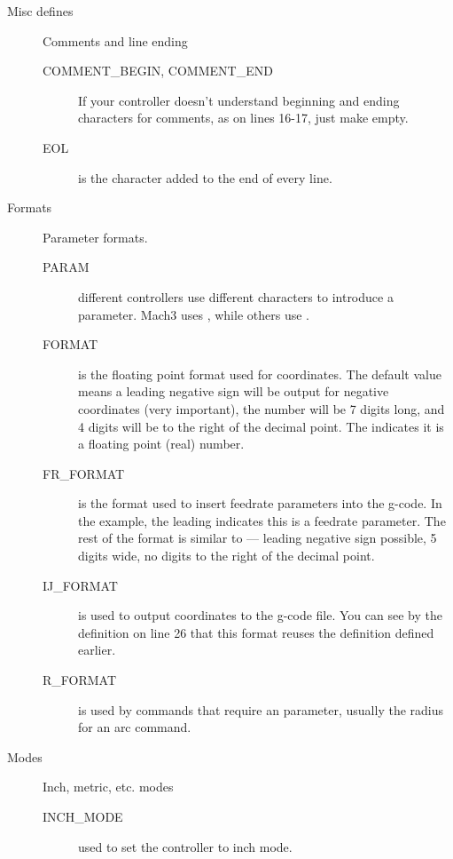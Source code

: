\documentclass[11pt]{book}
\begin{document}
\begin{description}
\item[Misc defines] Comments and line ending
\begin{description}
	\item[COMMENT\_{}BEGIN, COMMENT\_{}END] If your controller doesn't understand beginning and ending characters for comments, as on lines 16-17, just make  empty.

	\item[EOL] is the character added to the end of every line.
\end{description}

\item[Formats] Parameter formats.
\begin{description}
    \item[PARAM] different controllers use different characters to introduce a parameter. Mach3 uses , while others use \code{\#}.
    
    \item[FORMAT] is the floating point format used for coordinates. The default value  means a leading negative sign will be output for negative coordinates (very important), the number will be 7 digits long, and 4 digits will be to the right of the decimal point. The  indicates it is a floating point (real) number.
    
    \item[FR\_{}FORMAT] is the format used to insert feedrate parameters into the g-code. In the example, the leading  indicates this is a feedrate parameter. The rest of the format is similar to  --- leading negative sign possible, 5 digits wide, no digits to the right of the decimal point.
    
    \item[IJ\_{}FORMAT] is used to output  coordinates to the g-code file. You can see by the definition on line 26 that this format reuses the  definition defined earlier.
    
    \item[R\_{}FORMAT] is used by commands that require an  parameter, usually the radius for an arc command.
\end{description}

\item[Modes] Inch, metric, etc. modes
\begin{description}
    \item[INCH\_{}MODE] used to set the controller to inch mode.
    

\end{description}
\end{description}
\end{document}

